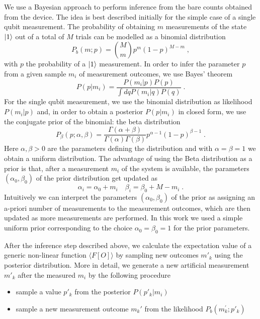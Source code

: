 \documentclass[Dual]{msu-thesis}
\begin{document}
We use a Bayesian approach to perform inference from the bare counts obtained from the device. The idea is best described initially for the simple case of a single qubit measurement. The probability of obtaining $m$ measurements of the state $\ket{1}$ out of a total of $M$ trials can be modelled as a binomial distribution
\begin{equation}
P_b(m;p) =     \binom{M}{m}p^{m}(1-p)^{M-m}\;,
\end{equation}
with $p$ the probability of a $\ket{1}$ measurement. In order to infer the parameter $p$ from a given sample $m_i$ of measurement outcomes, we use Bayes' theorem
\begin{equation}
P(p|m_i) = \frac{P(m_i|p)P(p)}{\int dq P(m_i|q)P(q)}\;.
\end{equation}
For the single qubit measurement, we use the binomial distribution as likelihood $P(m_i|p)$ and, in order to obtain a posterior $P(p|m_i)$ in closed form, we use the conjugate prior of the binomial: the beta distribution
\begin{equation}
P_\beta(p;\alpha,\beta) = \frac{\Gamma(\alpha+\beta)}{\Gamma(\alpha)\Gamma(\beta)} p^{\alpha-1}(1-p)^{\beta-1}\;.
\end{equation}
Here $\alpha,\beta>0$ are the parameters defining the distribution and with $\alpha=\beta=1$ we obtain a uniform distribution. The advantage of using the Beta distribution as a prior is that, after a measurement $m_i$ of the system is available, the parameters $(\alpha_0,\beta_0)$ of the prior distribution get updated as
\begin{equation}
\alpha_i = \alpha_0 + m_i\quad\beta_i=\beta_0 + M-m_i\;.
\end{equation}
Intuitively we can interpret the parameters $(\alpha_0,\beta_0)$ of the prior as assigning an a-priori number of measurements to the measurement outcomes, which are then updated as more measurements are performed. In this work we used a simple uniform prior corresponding to the choice $\alpha_0=\beta_0=1$ for the prior parameters.

After the inference step described above, we calculate the expectation value of a generic non-linear function $\langle F[O]\rangle$ by sampling new outcomes $m'_k$ using the posterior distribution. More in detail, we generate a new artificial measurement $m'_k$ after the measured $m_i$ by the following procedure
\begin{itemize}
    \item sample a value $p'_k$ from the posterior $P(p'_k\lvert m_i)$ 
	\item sample a new measurement outcome $m_k'$ from the likelihood $P_b(m_k^\prime;p'_k)$
\end{itemize}
\end{document}
